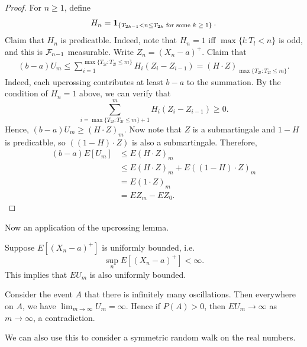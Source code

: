 \documentclass[a4paper]{article}
\begin{document}
\begin{proof}
  For $n \geq 1$, define
  \[
    H_n = \operatorname{\mathbf{1}}_{\{T_{2k-1} < n \leq T_{2k} \text{ for some $k \geq 1$}\}}.
  \]
  Claim that $H_n$ is predicatble. Indeed, note that
  $H_n = 1$ iff $\max \{l : T_l < n\}$ is odd, and this is
  $\mathcal{F}_{n - 1}$ measurable. Write $Z_n = (X_n - a)^+$.
  Claim that
  \begin{align*}
    (b - a) U_m
    \leq \sum_{i=1}^{\max \{T_{2l} : T_{2l} \leq m\}}
    H_i (Z_i - Z_{i - 1})
    = (H \cdot Z)_{\max \{T_{2l} : T_{2l} \leq m\}}.
  \end{align*}
  Indeed, each upcrossing contributes at least $b - a$ to the summation.
  By the condition of $H_n = 1$ above, we can verify that
  \[
    \sum_{i = \max \{T_{2l} : T_{2l} \leq m\} + 1}^m H_i (Z_i - Z_{i - 1}) \geq 0.
  \]
  Hence, $(b - a) U_m \geq (H \cdot Z)_m$. Now note that $Z$ is a
  submartingale and $1 - H$ is predicatble, so
  $((1 - H) \cdot Z)$ is also a submartingale. Therefore,
  \begin{align*}
    (b - a) E[U_m]
     & \leq E (H \cdot Z)_m                         \\
     & \leq E (H \cdot Z)_m + E ((1 - H) \cdot Z)_m \\
     & = E (1 \cdot Z)_m                            \\
     & = E Z_m - E Z_0.
  \end{align*}
\end{proof}

Now an application of the upcrossing lemma.

\begin{eg}
  Suppose $E [(X_n - a)^+]$ is uniformly bounded, i.e.\
  \[
    \sup_n E [(X_n - a)^+] < \infty.
  \]
  This implies that $E U_m$ is also uniformly bounded.

  Consider the event $A$ that there is infinitely many oscillations.
  Then everywhere on $A$, we have $\lim_{m \to \infty} U_m = \infty$.
  Hence if $P(A) > 0$, then $E U_m \to \infty$ as $m \to \infty$, a
  contradiction.
\end{eg}

We can also use this to consider a symmetric random walk on
the real numbers.
\end{document}
